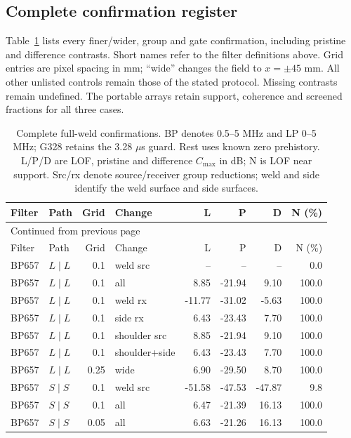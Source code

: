 \subsection{Complete confirmation register}
Table~\ref{saftapp:archive:full:register} lists every finer/wider, group and gate confirmation, including pristine and difference contrasts. Short names refer to the filter definitions above. Grid entries are pixel spacing in mm; ``wide'' changes the field to $x=\pm45$ mm. All other unlisted controls remain those of the stated protocol. Missing contrasts remain undefined. The portable arrays retain support, coherence and screened fractions for all three cases.
{\small\setlength{\tabcolsep}{4pt}
\singlespacing
\begin{longtable}{@{}llrlrrrr@{}}
\caption{Complete full-weld confirmations. BP denotes 0.5--5 MHz and LP 0--5 MHz; G328 retains the 3.28 $\mu$s guard. Rest uses known zero prehistory. L/P/D are LOF, pristine and difference $C_{\max}$ in dB; N is LOF near support. Src/rx denote source/receiver group reductions; weld and side identify the weld surface and side surfaces.}\label{saftapp:archive:full:register}\\
\toprule Filter & Path & Grid & Change & L & P & D & N (\%)\\\midrule\endfirsthead
\multicolumn{8}{l}{\small Continued from previous page}\\\toprule Filter & Path & Grid & Change & L & P & D & N (\%)\\\midrule\endhead
\bottomrule\endfoot
BP657 & $L\mid L$ & 0.1 & weld src & -- & -- & -- & 0.0 \\
BP657 & $L\mid L$ & 0.1 & all & 8.85 & -21.94 & 9.10 & 100.0 \\
BP657 & $L\mid L$ & 0.1 & weld rx & -11.77 & -31.02 & -5.63 & 100.0 \\
BP657 & $L\mid L$ & 0.1 & side rx & 6.43 & -23.43 & 7.70 & 100.0 \\
BP657 & $L\mid L$ & 0.1 & shoulder src & 8.85 & -21.94 & 9.10 & 100.0 \\
BP657 & $L\mid L$ & 0.1 & shoulder+side & 6.43 & -23.43 & 7.70 & 100.0 \\
BP657 & $L\mid L$ & 0.25 & wide & 6.90 & -29.50 & 8.70 & 100.0 \\
BP657 & $S\mid S$ & 0.1 & weld src & -51.58 & -47.53 & -47.87 & 9.8 \\
BP657 & $S\mid S$ & 0.1 & all & 6.47 & -21.39 & 16.13 & 100.0 \\
BP657 & $S\mid S$ & 0.05 & all & 6.63 & -21.26 & 16.13 & 100.0 \\

\end{longtable}}

